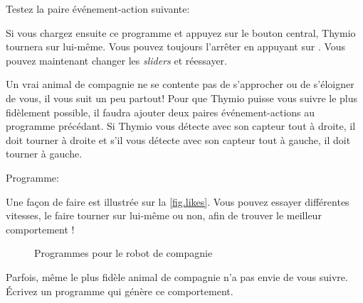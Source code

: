 Testez la paire événement-action suivante: 

Si vous chargez ensuite ce programme et appuyez sur le bouton central, Thymio tournera sur lui-même. Vous pouvez toujours l'arrêter en appuyant sur .
Vous pouvez maintenant changer les \textit{sliders} et réessayer.



Un vrai animal de compagnie ne se contente pas de s'approcher ou de s'éloigner de vous, il vous suit un peu partout! 
Pour que Thymio puisse vous suivre le plus fidèlement possible, il faudra ajouter deux paires événement-actions au programme précédant.
Si Thymio vous détecte avec son capteur tout à droite, il doit tourner à droite et s'il vous détecte avec son capteur tout à gauche, il doit tourner à gauche.

{\raggedleft \hfill Programme: }

Une façon de faire est illustrée sur la \cref{fig.likes}.
Vous pouvez essayer différentes vitesses, le faire tourner sur lui-même ou non, afin de trouver le meilleur comportement !

\begin{figure}
	\hfill
        \caption{Programmes pour le robot de compagnie}\label{fig.likes-hates}
\end{figure}





Parfois, même le plus fidèle animal de compagnie n'a pas envie de vous suivre. 
Écrivez un programme qui génère ce comportement.


